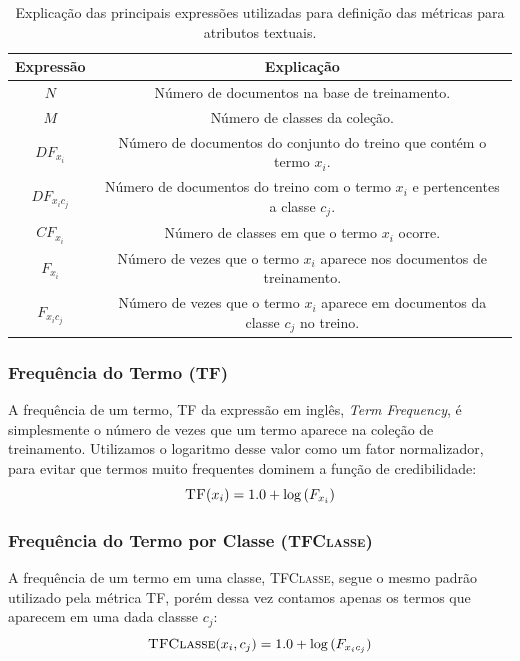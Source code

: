 \begin{table}[ht*]
\centering
\begin{tabular}{|c|c|}
\toprule
    \textbf{Expressão} & \textbf{Explicação} \\
\midrule
    $N$           & Número de documentos na base de treinamento. \tabularnewline \hline
    $M$           & Número de classes da coleção. \tabularnewline \hline
    $DF_{x_i} $   & Número de documentos do conjunto do treino que contém o termo $x_i$. \tabularnewline \hline
    $DF_{x_ic_j}$ & Número de documentos do treino com o termo $x_i$ e pertencentes a classe $c_j$. \tabularnewline \hline
    $CF_{x_i}$    & Número de classes em que o termo $x_i$ ocorre. \tabularnewline \hline 
    $F_{x_i}$     & Número de vezes que o termo $x_i$ aparece nos documentos de treinamento. \tabularnewline \hline
    $F_{x_ic_j}$  & Número de vezes que o termo $x_i$ aparece em documentos da classe $c_j$ no treino. \tabularnewline 
\bottomrule
\end{tabular}
\caption{Explicação das principais expressões utilizadas para definição das métricas para atributos textuais.}
\label{table::metricas_textuais}
\end{table}


\subsubsection{Frequência do Termo (TF)}
\label{subsubsection::sumtf}

A frequência de um termo, \textsc{TF} da expressão em inglês, \textit{Term Frequency}, é simplesmente o número de vezes que um termo aparece na coleção de treinamento. Utilizamos o logaritmo desse valor como um fator normalizador, para evitar que termos muito frequentes dominem a função de credibilidade:
\begin{equation}\label{eqn::sumtf}
   \textsc{TF}(x_i) = 1.0 + \log{ ( F_{x_i} ) }
\end{equation}


\subsubsection{Frequência do Termo por Classe (\textsc{TFClasse})}
\label{subsubsection::tf}

A frequência de um termo em uma classe, \textsc{TFClasse}, segue o mesmo padrão utilizado pela métrica \textsc{TF}, porém dessa vez contamos apenas os termos que aparecem em uma dada classse $c_j$:
\begin{equation}\label{eqn::tf}
  \textsc{TFClasse}(x_i, c_j) = 1.0 + \log{ ( F_{x_ic_j} ) }
\end{equation}


